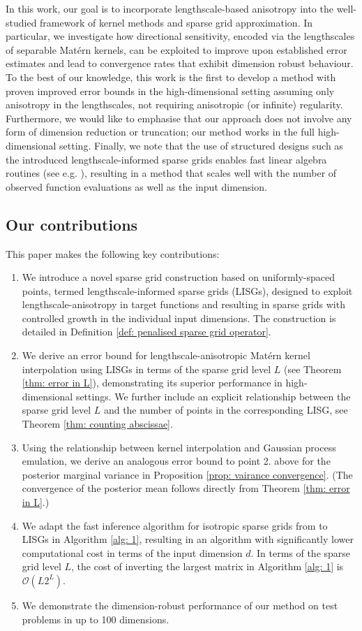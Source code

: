 \documentclass[pdflatex,sn-mathphys-num]{sn-jnl}%
\theoremstyle{thmstyleone}%
\theoremstyle{thmstyletwo}%
\theoremstyle{thmstylethree}%
\begin{document}
In this work, our goal is to incorporate lengthscale-based anisotropy into the well-studied framework of kernel methods and sparse grid approximation.
In particular, we investigate how directional sensitivity, encoded via the lengthscales of separable Mat\'ern kernels, can be exploited to improve upon established error estimates and lead to convergence rates that exhibit dimension robust behaviour. To the best of our knowledge, this work is the first to develop a method with proven improved error bounds in the high-dimensional setting assuming only anisotropy in the lengthscales, not requiring anisotropic (or infinite) regularity. Furthermore, we would like to emphasise that our approach does not involve any form of dimension reduction or truncation; our method works in the full high-dimensional setting.
Finally, we note that the use of structured designs such as the introduced lengthscale-informed sparse grids enables fast linear algebra routines (see e.g. \cite{jagadeeswaran2019fast, Plumlee2014}), resulting in a method that scales well with the number of observed function evaluations as well as the input dimension.

\subsection*{Our contributions}
This paper makes the following key contributions:
\begin{enumerate}
    \item We introduce a novel sparse grid construction based on uniformly-spaced points, termed lengthscale-informed sparse grids (LISGs), designed to exploit lengthscale-anisotropy in target functions and resulting in sparse grids with controlled growth in the individual input dimensions. The construction is detailed in Definition \ref{def: penalised sparse grid operator}.
    \item We derive an error bound for lengthscale-anisotropic Mat\'ern kernel interpolation using LISGs
    in terms of the sparse grid level $L$ (see Theorem \ref{thm: error in L}), demonstrating its superior performance in high-dimensional settings. 
    We further include an explicit relationship between the sparse grid level $L$ and the number of points in the corresponding LISG, see Theorem \ref{thm: counting abscissae}.
    \item Using the relationship between kernel interpolation and Gaussian process emulation, we derive an analogous error bound to point 2. above for the posterior marginal variance in Proposition \ref{prop: vairance convergence}. (The convergence of the posterior mean follows directly from Theorem \ref{thm: error in L}.)
    \item We adapt the fast inference algorithm for isotropic sparse grids from \cite{Plumlee2014} to LISGs in Algorithm \ref{alg: 1}, resulting in an algorithm with significantly lower computational cost in terms of the input dimension $d$. In terms of the sparse grid level $L$, the cost of inverting the largest matrix in Algorithm \ref{alg: 1} is $\mathcal O(L 2^L)$.
    \item We demonstrate the dimension-robust performance of our method on test problems in up to 100 dimensions.
\end{enumerate}
\end{document}
